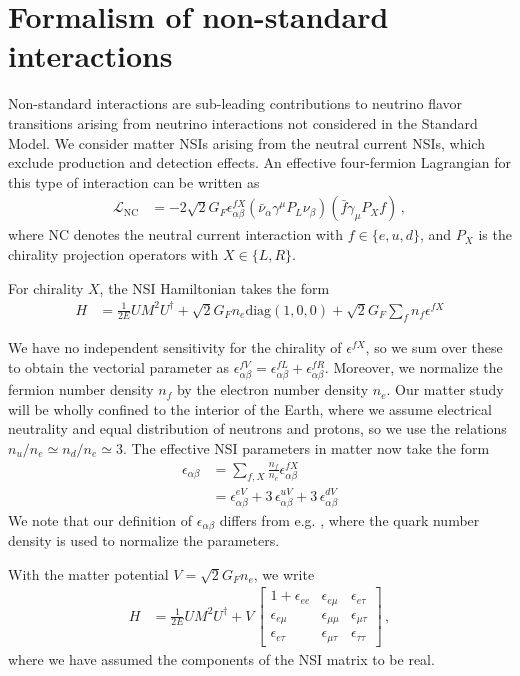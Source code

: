 \documentclass[draft=True]{revtex4-2}
\begin{document}
\section{Formalism of non-standard interactions}
Non-standard interactions are sub-leading contributions to neutrino flavor transitions arising from neutrino interactions not considered in the Standard Model.
We consider matter NSIs arising from the neutral current NSIs, which exclude production 
and detection effects. An effective four-fermion Lagrangian for this type of interaction can be written as
\begin{align}
   \mathcal{L}_{\mathrm{NC}} &= -2 \sqrt{2} G_{F} \epsilon_{\alpha \beta}^{f X}\left(\bar{\nu}_{\alpha} \gamma^{\mu} P_{L} \nu_{\beta}\right)\left(\bar{f} \gamma_{\mu} P_{X} f\right)\,,
\end{align}
where NC denotes the neutral current interaction with 
$f \in \{e,u,d\}$, and $P_X$ is the chirality projection operators with $X \in \{L,R\}$.  

For chirality $X$, the NSI Hamiltonian takes the form 
\begin{align}
   H &= \frac{1}{2E} UM^2U^\dagger + \sqrt{2}G_F n_e \text{diag}(1,0,0) + \sqrt{2}G_F \sum_f n_f \epsilon^{fX}
\end{align}

We have no independent sensitivity for the chirality of $\epsilon^{fX}$, so we sum over these to obtain the vectorial parameter as $\epsilon^{fV}_{\alpha\beta} = \epsilon^{fL}_{\alpha\beta}+ \epsilon^{fR}_{\alpha\beta}$.
Moreover, we normalize the fermion number density $n_f$ by
the electron number density $n_e$. Our matter study will be wholly confined to the interior of the Earth, where we assume electrical neutrality and equal distribution of neutrons and protons, 
so we use the relations $n_u/n_e \simeq n_d/n_e \simeq 3$.
The effective NSI parameters in matter now take the form
\begin{align} \label{eq:epsilon}
    \epsilon_{\alpha\beta} &= \sum_{f,X} \frac{n_f}{n_e} \epsilon^{fX}_{\alpha\beta} \nonumber \\
                           &= \epsilon_{\alpha\beta}^{eV} + 3\,\epsilon_{\alpha\beta}^{uV} + 3\,\epsilon_{\alpha\beta}^{dV}
\end{align}
We note that our definition of $\epsilon_{\alpha\beta}$ differs from e.g. \cite{deepcoreNSI}, where the quark number density is used to normalize
the parameters.

With the matter potential $V = \sqrt{2}G_F n_e$, we write
\begin{align} \label{eq:H_NSI}
   H &= \frac{1}{2E} UM^2U^\dagger + V\,
   \begin{bmatrix}      
      1 + \epsilon_{ee} & \epsilon_{e\mu} & \epsilon_{e\tau}  \\
      \epsilon_{e\mu} & \epsilon_{\mu\mu} & \epsilon_{\mu\tau}  \\
      \epsilon_{e \tau} & \epsilon_{\mu\tau} & \epsilon_{\tau\tau}
  \end{bmatrix}\,,
\end{align}
where we have assumed the components of the NSI matrix to be real. 
\end{document}
